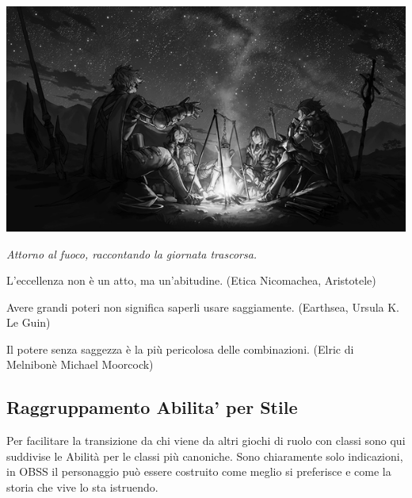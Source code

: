 \begin{center}

\includegraphics[width=0.9\linewidth]{immagini/Granblue.Fantasy.full.2108782.png}


\emph{Attorno al fuoco, raccontando la giornata trascorsa.}
\end{center}


\bigskip

\begin{enfasi}

	L'eccellenza non è un atto, ma un'abitudine. (Etica Nicomachea, Aristotele)

	\medskip

	Avere grandi poteri non significa saperli usare saggiamente. (Earthsea, Ursula K. Le Guin)

	\medskip

	Il potere senza saggezza è la più pericolosa delle combinazioni. (Elric di Melnibonè Michael Moorcock)

\end{enfasi}


\pagebreak

\subsection{Raggruppamento Abilita' per Stile}

Per facilitare la transizione da chi viene da altri giochi di ruolo con classi sono qui suddivise le Abilità per le classi più canoniche. Sono chiaramente solo indicazioni, in OBSS il personaggio può essere costruito come meglio si preferisce e come la storia che vive lo sta istruendo.

